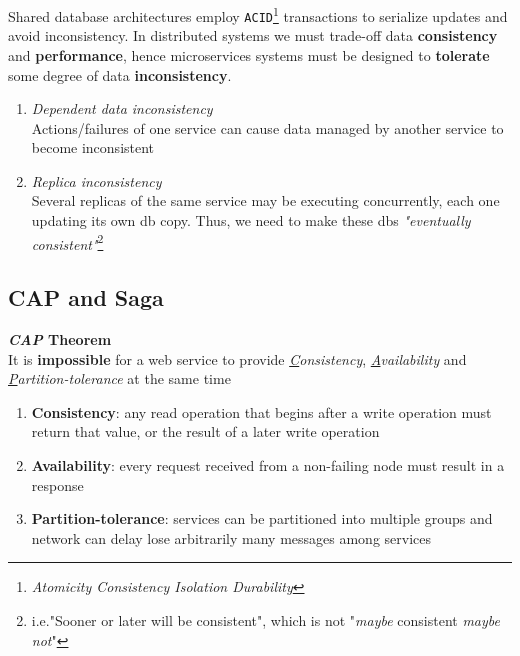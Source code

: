Shared database architectures employ \texttt{ACID}\footnote{\textit{Atomicity Consistency Isolation Durability}} transactions to serialize updates and
avoid inconsistency.
In distributed systems we must trade-off data \textbf{consistency} and \textbf{performance},
hence microservices systems must be designed to \textbf{tolerate} some degree of data
\textbf{inconsistency}.
\begin{enumerate}
   \item \textit{Dependent data inconsistency}\\
   Actions/failures of one service can cause data managed by another service to become
   inconsistent
   \item \textit{Replica inconsistency}\\
   Several replicas of the same service may be executing concurrently,
   each one updating its own db copy.
   Thus, we need to make these dbs \textit{"eventually consistent"}\footnote{i.e."Sooner or later will be consistent", which is not "\textit{maybe} consistent \textit{maybe not}"}
\end{enumerate}

\subsection{CAP and Saga}
\begin{center}
   \textbf{\textit{CAP} Theorem}\\
   
   It is \textbf{impossible} for a web service to provide \textit{\underline{C}onsistency}, \textit{\underline{A}vailability} and \textit{\underline{P}artition-tolerance} at the same time
   
\end{center}
\begin{enumerate}
   \item \textbf{Consistency}:
   any read operation that begins after a write operation must return that value, or the
   result of a later write operation
   \item \textbf{Availability}:
   every request received from a non-failing node must result in a response
   \item \textbf{Partition-tolerance}:
   services can be partitioned into multiple groups and network can delay lose arbitrarily many messages among services
\end{enumerate}


